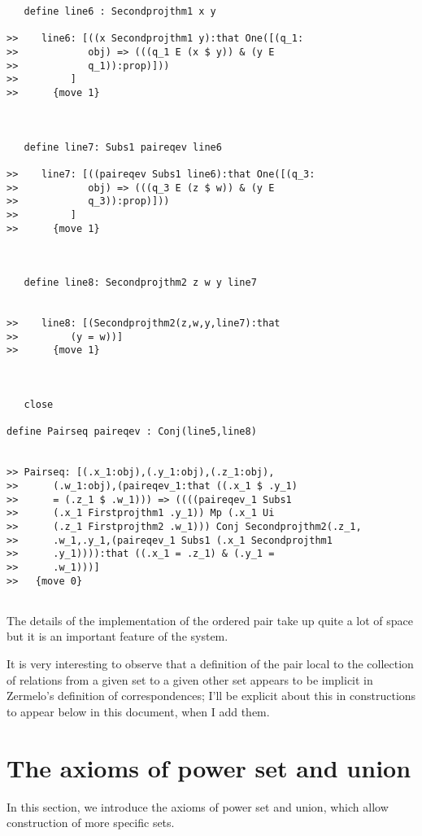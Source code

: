 \documentclass[12pt]{article}
\begin{document}
\begin{verbatim}
   define line6 : Secondprojthm1 x y

>>    line6: [((x Secondprojthm1 y):that One([(q_1:
>>            obj) => (((q_1 E (x $ y)) & (y E
>>            q_1)):prop)]))
>>         ]
>>      {move 1}



   define line7: Subs1 paireqev line6

>>    line7: [((paireqev Subs1 line6):that One([(q_3:
>>            obj) => (((q_3 E (z $ w)) & (y E
>>            q_3)):prop)]))
>>         ]
>>      {move 1}



   define line8: Secondprojthm2 z w y line7


>>    line8: [(Secondprojthm2(z,w,y,line7):that
>>         (y = w))]
>>      {move 1}



   close

define Pairseq paireqev : Conj(line5,line8)


>> Pairseq: [(.x_1:obj),(.y_1:obj),(.z_1:obj),
>>      (.w_1:obj),(paireqev_1:that ((.x_1 $ .y_1)
>>      = (.z_1 $ .w_1))) => ((((paireqev_1 Subs1
>>      (.x_1 Firstprojthm1 .y_1)) Mp (.x_1 Ui
>>      (.z_1 Firstprojthm2 .w_1))) Conj Secondprojthm2(.z_1,
>>      .w_1,.y_1,(paireqev_1 Subs1 (.x_1 Secondprojthm1
>>      .y_1)))):that ((.x_1 = .z_1) & (.y_1 =
>>      .w_1)))]
>>   {move 0}


\end{verbatim}

The details of the implementation of the ordered pair take up quite a lot of space but it is an important feature of the system.

It is very interesting to observe that a definition of the pair local to the collection of relations from a given set to a given other set appears to be implicit in Zermelo's definition of correspondences;  I'll be explicit about this in constructions to appear below in this document, when I add them.

\section{The axioms of power set and union}

In this section, we introduce the axioms of power set and union, which allow construction of more specific sets.
\end{document}
